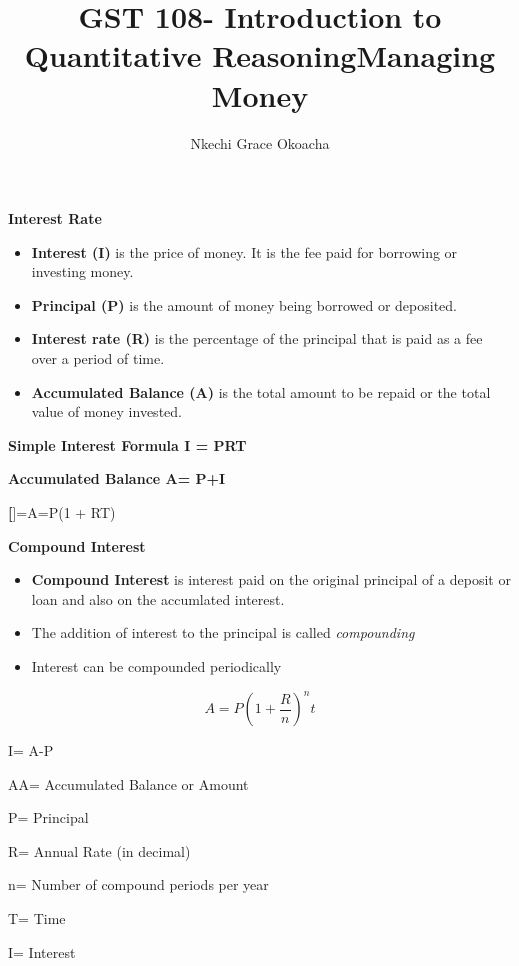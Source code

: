 \documentclass{article}
\begin{document}
	\author{Nkechi Grace Okoacha}
	\title{GST 108- Introduction to Quantitative Reasoning}
	\title{Managing Money}
	\maketitle
	
	\begin{center}
		\textbf{Interest Rate}
	\end{center}
\begin{itemize}
	\item \textbf{Interest (I)} is the price of money. It is the fee paid for borrowing or investing money.
	\item\textbf{Principal (P)} is the amount of money being borrowed or deposited.
	\item\textbf{Interest rate (R)} is the percentage of the principal that is paid as a fee over a period of time.
	\item\textbf{Accumulated Balance (A)} is the total amount to be repaid or the total value of money invested.
\end{itemize}

\begin{center}
	\textbf{Simple Interest Formula I = PRT}
\end{center}
\begin{center}
	\textbf{Accumulated Balance A= P+I}
\end{center}
\begin{center}
	\textbf*[]={A=P(1 + RT)}
\end{center}
\begin{center}
	\textbf{Compound Interest}
\end{center}
\begin{itemize}
	\item \textbf{Compound Interest} is interest paid on the original principal of a deposit or loan and also on the accumlated interest.
	\item The addition of interest to the principal is called \textit{compounding}
	\item Interest can be compounded periodically
\end{itemize}
\begin{center}
	\begin{equation}
		A = P(1 + \frac{R}{n})^nt
	\end{equation}
\end{center}
\begin{center}
	I= A-P
\end{center}
\begin{flushleft}
	AA= Accumulated Balance or Amount
	
	P= Principal
	
	R= Annual Rate (in decimal)
	
	n= Number of compound periods per year
	
	T= Time
	
	I= Interest
	
\end{flushleft}
\end{document}
